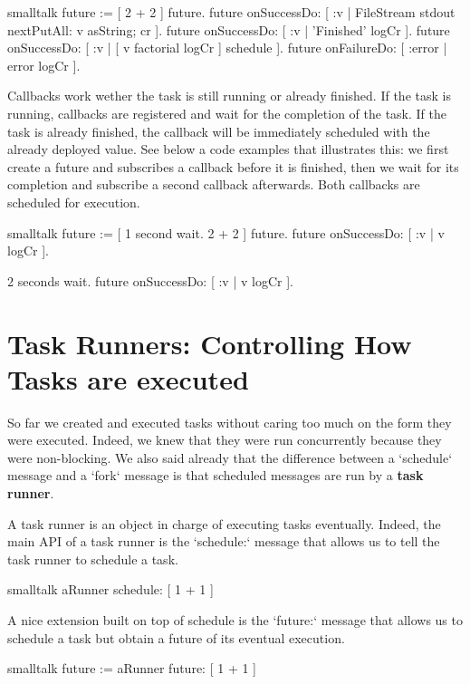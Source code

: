 \documentclass[10pt,twoside,english]{_support/latex/sbabook/sbabook}
\begin{document}
\begin{displaycode}{smalltalk}
future := [ 2 + 2 ] future.
future onSuccessDo: [ :v | FileStream stdout nextPutAll: v asString; cr ].
future onSuccessDo: [ :v | 'Finished' logCr ].
future onSuccessDo: [ :v | [ v factorial logCr ] schedule ].
future onFailureDo: [ :error | error logCr ].
\end{displaycode}

Callbacks work wether the task is still running or already finished. If the task is running, callbacks are registered and wait for the completion of the task. If the task is already finished, the callback will be immediately scheduled with the already deployed value. See below a code examples that illustrates this: we first create a future and subscribes a callback before it is finished, then we  wait for its completion and subscribe a second callback afterwards. Both callbacks are scheduled for execution.

\begin{displaycode}{smalltalk}
future := [ 1 second wait. 2 + 2 ] future.
future onSuccessDo: [ :v | v logCr ].

2 seconds wait.
future onSuccessDo: [ :v | v logCr ].
\end{displaycode}
\chapter{Task Runners: Controlling How Tasks are executed }
So far we created and executed tasks without caring too much on the form they were executed. Indeed, we knew that they were run concurrently because they were non-blocking. We also said already that the difference between a `schedule` message and a `fork` message is that scheduled messages are run by a \textbf{task runner}.

A task runner is an object in charge of executing tasks eventually. Indeed, the main API of a task runner is the `schedule:` message that allows us to tell the task runner to schedule a task.

\begin{displaycode}{smalltalk}
aRunner schedule: [ 1 + 1 ]
\end{displaycode}

A nice extension built on top of schedule is the  `future:` message that allows us to schedule a task but obtain a future of its eventual execution.

\begin{displaycode}{smalltalk}
future := aRunner future: [ 1 + 1 ]
\end{displaycode}
\end{document}

